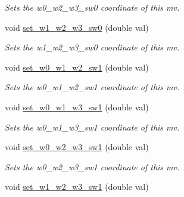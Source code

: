 \begin{DoxyCompactItemize}
\begin{DoxyCompactList}\small\item\em Sets the w0\-\_\-w2\-\_\-w3\-\_\-sw0 coordinate of this mv. \end{DoxyCompactList}\item 
\hypertarget{classe3ga_1_1mv_a4a0d9a8d6724d0a68ba9d72e6cb38271}{void \hyperlink{classe3ga_1_1mv_a4a0d9a8d6724d0a68ba9d72e6cb38271}{set\-\_\-w1\-\_\-w2\-\_\-w3\-\_\-sw0} (double val)}\label{classe3ga_1_1mv_a4a0d9a8d6724d0a68ba9d72e6cb38271}

\begin{DoxyCompactList}\small\item\em Sets the w1\-\_\-w2\-\_\-w3\-\_\-sw0 coordinate of this mv. \end{DoxyCompactList}\item 
\hypertarget{classe3ga_1_1mv_ae078a539d3d4fdfc771d5dcfed524c03}{void \hyperlink{classe3ga_1_1mv_ae078a539d3d4fdfc771d5dcfed524c03}{set\-\_\-w0\-\_\-w1\-\_\-w2\-\_\-sw1} (double val)}\label{classe3ga_1_1mv_ae078a539d3d4fdfc771d5dcfed524c03}

\begin{DoxyCompactList}\small\item\em Sets the w0\-\_\-w1\-\_\-w2\-\_\-sw1 coordinate of this mv. \end{DoxyCompactList}\item 
\hypertarget{classe3ga_1_1mv_a0ef880ee15977405df5ab2adf3c8fd14}{void \hyperlink{classe3ga_1_1mv_a0ef880ee15977405df5ab2adf3c8fd14}{set\-\_\-w0\-\_\-w1\-\_\-w3\-\_\-sw1} (double val)}\label{classe3ga_1_1mv_a0ef880ee15977405df5ab2adf3c8fd14}

\begin{DoxyCompactList}\small\item\em Sets the w0\-\_\-w1\-\_\-w3\-\_\-sw1 coordinate of this mv. \end{DoxyCompactList}\item 
\hypertarget{classe3ga_1_1mv_ae46e5b27cc8dd31dfe962039bbdc04b1}{void \hyperlink{classe3ga_1_1mv_ae46e5b27cc8dd31dfe962039bbdc04b1}{set\-\_\-w0\-\_\-w2\-\_\-w3\-\_\-sw1} (double val)}\label{classe3ga_1_1mv_ae46e5b27cc8dd31dfe962039bbdc04b1}

\begin{DoxyCompactList}\small\item\em Sets the w0\-\_\-w2\-\_\-w3\-\_\-sw1 coordinate of this mv. \end{DoxyCompactList}\item 
\hypertarget{classe3ga_1_1mv_a8fd0812f8a50d6ed2520b7c4893348ae}{void \hyperlink{classe3ga_1_1mv_a8fd0812f8a50d6ed2520b7c4893348ae}{set\-\_\-w1\-\_\-w2\-\_\-w3\-\_\-sw1} (double val)}\label{classe3ga_1_1mv_a8fd0812f8a50d6ed2520b7c4893348ae}


\end{DoxyCompactItemize}
